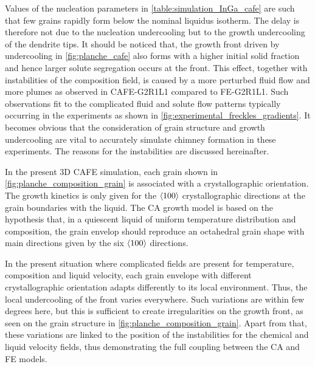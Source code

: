 Values of the nucleation parameters in \cref{table:simulation_InGa_cafe} are such 
that few grains rapidly form below the nominal liquidus isotherm. The delay is therefore not due to the nucleation 
undercooling but to the growth undercooling of the dendrite tips. It should be noticed that, the growth front driven 
by undercooling in \cref{fig:planche_cafe} also forms with a higher initial solid fraction and hence larger solute segregation occurs 
at the front. This effect, together with instabilities of the composition field, is caused by a more perturbed fluid flow 
and more plumes as observed in CAFE-G2R1L1 compared to FE-G2R1L1. Such observations fit to the complicated fluid and solute 
flow patterns typically occurring in the experiments as shown in \cref{fig:experimental_freckles_gradients}. 
It becomes obvious that the consideration of grain 
structure and growth undercooling are vital to accurately simulate chimney formation in these experiments. The reasons for the 
instabilities are discussed hereinafter. 

In the present 3D CAFE simulation, each grain shown in \cref{fig:planche_composition_grain} 
is associated with a crystallographic orientation. 
The growth kinetics is only given for the $\left \langle 100 \right \rangle$ crystallographic directions at the grain boundaries with the liquid. The CA growth model 
is based on the hypothesis that, in a quiescent liquid of uniform temperature distribution and composition, the grain envelop should 
reproduce an octahedral grain shape with main directions given by the six $\left \langle 100 \right \rangle$ directions. 

In the present situation where complicated 
fields are present for temperature, composition and liquid velocity, each grain envelope with different crystallographic orientation 
adapts differently to its local environment. Thus, the local undercooling of the front varies everywhere. Such variations are within 
few degrees here, but this is sufficient to create irregularities on the growth front, as seen on the grain structure in \cref{fig:planche_composition_grain}. 
Apart from that, these variations are linked to the position of the instabilities for the chemical and liquid velocity fields, thus 
demonstrating the full coupling between the CA and FE models.


